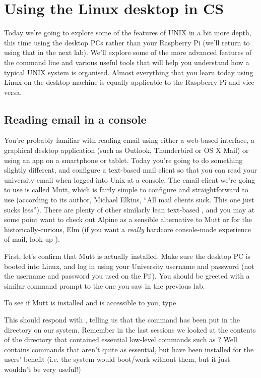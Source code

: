\chapter{Using the Linux desktop in CS}

Today we're going to explore some of the features of UNIX in a bit more depth, this time using the desktop PCs rather than your Raspberry Pi (we'll return to using that in the next lab). We'll explore some of the more advanced features of the command line and various useful tools that will help you understand how a typical UNIX system is organised. Almost everything that you learn today using Linux on the desktop machine is equally applicable to the Raspberry Pi and vice versa. 

\section{Reading email in a console}

You're probably familiar with reading email using either a web-based interface, a graphical desktop application (such as Outlook, Thunderbird or OS X Mail) or using an app on a smartphone or tablet. Today you're going to do something slightly different, and configure a text-based mail client so that you can read your university email when logged into Unix at a console. The email client we're going to use is called Mutt, which is fairly simple to configure and straightforward to use (according to its author, Michael Elkins, ``All mail clients suck. This one just sucks less''). There are plenty of other similarly lean text-based , and you may at some point want to check out Alpine as a sensible alternative to Mutt or for the historically-curious, Elm (if you want a \textit{really} hardcore console-mode experience of mail, look up ).

First, let's confirm that Mutt is actually installed. Make sure the desktop PC is booted into Linux, and log in using your University username and password (not the username and password you used on the Pi!). You should be greeted with a similar command prompt to the one you saw in the previous lab.

To see if Mutt is installed and is accessible to you, type


This should respond with , telling us that the  command has been put in the  directory on our system. Remember in the last sessions we looked at the contents of the  directory that contained essential low-level commands such as ? Well  contains commands that aren't quite as essential, but have been installed for the users' benefit (i.e. the system would boot/work without them, but it just wouldn't be very useful!)

